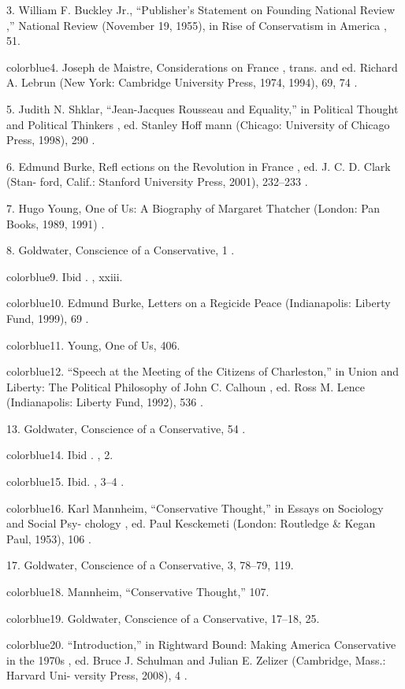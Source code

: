 	{\color{blue}3}. William F. Buckley Jr., “Publisher’s Statement on Founding National Review ,” National Review (November 19, 1955), in Rise of Conservatism in America , 51.


	{color{blue}4}. Joseph de Maistre, Considerations on France , trans. and ed. Richard A. Lebrun (New York: Cambridge University Press, 1974, 1994), 69, 74 .


	{\color{blue}5}. Judith N. Shklar, “Jean-Jacques Rousseau and Equality,” in Political Thought and Political Thinkers , ed. Stanley Hoff mann (Chicago: University of Chicago Press, 1998), 290 .


	{\color{blue}6}. Edmund Burke, Refl ections on the Revolution in France , ed. J. C. D. Clark (Stan- ford, Calif.: Stanford University Press, 2001), 232–233 .


	{\color{blue}7}. Hugo Young, One of Us: A Biography of Margaret Thatcher (London: Pan Books, 1989, 1991) .


	{\color{blue}8}. Goldwater, Conscience of a Conservative, 1 .


	{color{blue}9}. Ibid . , xxiii.


	{color{blue}10}. Edmund Burke, Letters on a Regicide Peace (Indianapolis: Liberty Fund, 1999), 69 .


	{color{blue}11}. Young, One of Us, 406.


	{color{blue}12}. “Speech at the Meeting of the Citizens of Charleston,” in Union and Liberty: The Political Philosophy of John C. Calhoun , ed. Ross M. Lence (Indianapolis: Liberty Fund, 1992), 536 .


	{\color{blue}13}. Goldwater, Conscience of a Conservative, 54 .


	{color{blue}14}. Ibid . , 2.


	{color{blue}15}. Ibid. , 3–4 .


	{color{blue}16}. Karl Mannheim, “Conservative Thought,” in Essays on Sociology and Social Psy- chology , ed. Paul Kesckemeti (London: Routledge & Kegan Paul, 1953), 106 .


	{\color{blue}17}. Goldwater, Conscience of a Conservative, 3, 78–79, 119.


	{color{blue}18}. Mannheim, “Conservative Thought,” 107.


	{color{blue}19}. Goldwater, Conscience of a Conservative, 17–18, 25.


	{color{blue}20}. “Introduction,” in Rightward Bound: Making America Conservative in the 1970s , ed. Bruce J. Schulman and Julian E. Zelizer (Cambridge, Mass.: Harvard Uni- versity Press, 2008), 4 .


